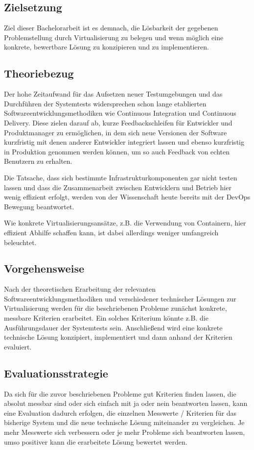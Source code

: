 \subsection{Zielsetzung}

Ziel dieser Bachelorarbeit ist es demnach, die Lösbarkeit der gegebenen Problemstellung durch Virtualisierung zu belegen und wenn möglich eine konkrete, bewertbare Lösung zu konzipieren und zu implementieren.

\subsection{Theoriebezug}

Der hohe Zeitaufwand für das Aufsetzen neuer Testumgebungen und das Durchführen der Systemtests widersprechen schon lange etablierten Softwareentwicklungsmethodiken wie Continuous Integration und Continuous Delivery. Diese zielen darauf ab, kurze Feedbackschleifen für Entwickler und Produktmanager zu ermöglichen, in dem sich neue Versionen der Software kurzfristig mit denen anderer Entwickler integriert lassen und ebenso kurzfristig in Produktion genommen werden können, um so auch Feedback von echten Benutzern zu erhalten.

Die Tatsache, dass sich bestimmte Infrastrukturkomponenten gar nicht testen lassen und dass die Zusammenarbeit zwischen Entwicklern und Betrieb hier wenig effizient erfolgt, werden von der Wissenschaft heute bereits mit der DevOps Bewegung beantwortet.

Wie konkrete Virtualisierungsansätze, z.B. die Verwendung von Containern, hier effizient Abhilfe schaffen kann, ist dabei allerdings weniger umfangreich beleuchtet.

\subsection{Vorgehensweise}

Nach der theoretischen Erarbeitung der relevanten Softwareentwicklungsmethodiken und verschiedener technischer Lösungen zur Virtualisierung werden für die beschriebenen Probleme zunächst konkrete, messbare Kriterien erarbeitet. Ein solches Kriterium könnte z.B. die Ausführungsdauer der Systemtests sein. Anschließend wird eine konkrete technische Lösung konzipiert, implementiert und dann anhand der Kriterien evaluiert.

\subsection{Evaluationsstrategie}

Da sich für die zuvor beschriebenen Probleme gut Kriterien finden lassen, die absolut messbar sind oder sich einfach mit ja oder nein beantworten lassen, kann eine Evaluation dadurch erfolgen, die einzelnen Messwerte / Kriterien für das bisherige System und die neue technische Lösung miteinander zu vergleichen. Je mehr Messwerte sich verbessern oder je mehr Probleme sich beantworten lassen, umso positiver kann die erarbeitete Lösung bewertet werden.